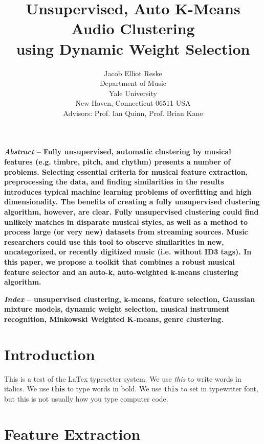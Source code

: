 \documentclass[12pt,twocolumn,titlepage]{article}
\begin{document}
\title{\huge{\textbf{Unsupervised, Auto K-Means \\Audio Clustering\\using Dynamic Weight Selection}}}

\author{Jacob Elliot Reske\\
Department of Music \\
Yale University \\
New Haven, Connecticut 06511 USA \\
Advisors: Prof. Ian Quinn, Prof. Brian Kane }

\maketitle

\textbf{\emph{Abstract} -- Fully unsupervised, automatic clustering by musical features (e.g. timbre, pitch, and rhythm) presents a number of problems. Selecting essential criteria for musical feature extraction, preprocessing the data, and finding similarities in the results introduces typical machine learning problems of overfitting and high dimensionality. The benefits of creating a fully unsupervised clustering algorithm, however, are clear. Fully unsupervised clustering could find unlikely matches in disparate musical styles, as well as a method to process large (or very new) datasets from streaming sources. Music researchers could use this tool to observe similarities in new, uncategorized, or recently digitized music (i.e. without ID3 tags). In this paper, we propose a toolkit that combines a robust musical feature selector and an auto-k, auto-weighted k-means clustering algorithm.}

\textbf{\emph{Index} -- unsupervised clustering, k-means, feature selection, Gaussian mixture models, dynamic weight selection, musical instrument recognition, Minkowski Weighted K-means, genre clustering.}



\section{Introduction}


This is a test of the LaTex typesetter system.
We use \emph{this} to write words in italics.
We use \textbf{this} to type words in bold.
We use \texttt{this} to set in typewriter font, but this is not usually how you type computer code.


\section{Feature Extraction}
\label{sec:feature}
\end{document}
